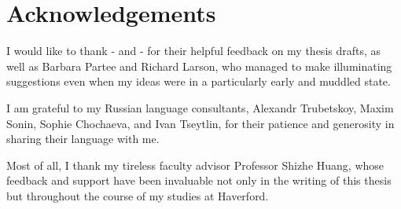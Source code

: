 \section*{Acknowledgements}
I would like to thank - and - for their helpful feedback on my thesis drafts, as well as Barbara Partee and Richard Larson, who managed to make illuminating suggestions even when my ideas were in a particularly early and muddled state.

I am grateful to my Russian language consultants, Alexandr Trubetskoy, Maxim Sonin, Sophie Chochaeva, and Ivan Tseytlin, for their patience and generosity in sharing their language with me.

Most of all, I thank my tireless faculty advisor Professor Shizhe Huang, whose feedback and support have been invaluable not only in the writing of this thesis but throughout the course of my studies at Haverford.